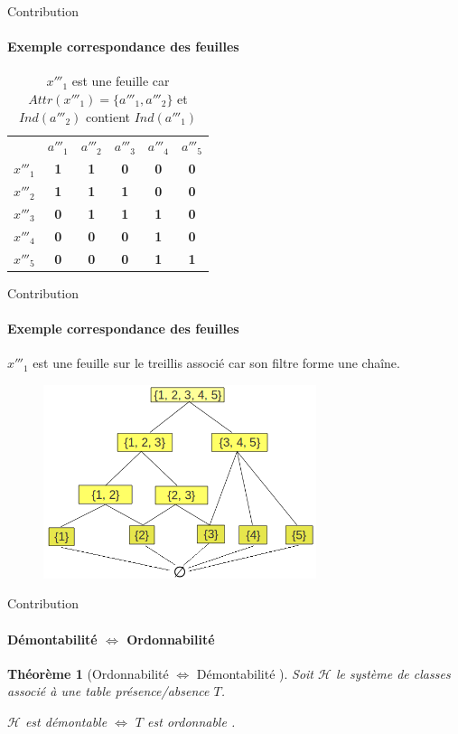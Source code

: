 \documentclass{beamer}
\newtheorem{theo}{Théorème}
\begin{document}
  \begin{frame}{Contribution}
  \framesubtitle{Exemple correspondance des feuilles}
	\begin{table}[htb]
	  \centering

	\begin{tabular}{lccccc}
	& $a'''_1$ & $a'''_2$ & $a'''_3$ & $a'''_4$ & $a'''_5$\\
	$x'''_1$ & \textbf{1} & \textbf{1} & \textbf{0} & \textbf{0} & \textbf{0}\\
	$x'''_2$ & \textbf{1} & \textbf{1} & \textbf{1} & \textbf{0} & \textbf{0}\\
	$x'''_3$ & \textbf{0} & \textbf{1} & \textbf{1} & \textbf{1} & \textbf{0}\\
	$x'''_4$ & \textbf{0} & \textbf{0} & \textbf{0} & \textbf{1} & \textbf{0}\\
	$x'''_5$ & \textbf{0} & \textbf{0} & \textbf{0} & \textbf{1} & \textbf{1}
	\end{tabular}
   \caption{$x'''_1$ est une feuille car $Attr(x'''_1) =\{a'''_1, a'''_2\}$ et  $Ind(a'''_2)$ contient $Ind(a'''_1)$}
	\end{table}
  \end{frame}

  \begin{frame}{Contribution}
  \framesubtitle{Exemple correspondance des feuilles}
   $x'''_1$ est une feuille sur le treillis associé car son filtre forme une chaîne.
   \begin{figure}
	\includegraphics[width=8cm]{images/treillismoins2.png} 
    
    \end{figure}
   
  \end{frame}

  \begin{frame}{Contribution}
  \framesubtitle{Démontabilité $\Leftrightarrow$ Ordonnabilité}
  \begin{theo}[Ordonnabilité $\Leftrightarrow$ Démontabilité ]
  Soit $\mathcal{H}$ le système de classes associé à une table présence/absence $T$.

  $\mathcal{H}$ est démontable $\Leftrightarrow$ $T$ est ordonnable .  
  \end{theo}
  \end{frame}
\end{document}
